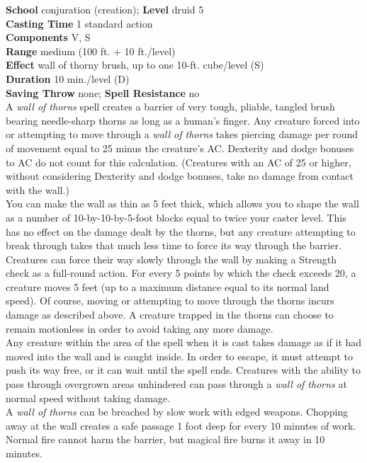 \textbf{School} conjuration (creation); \textbf{Level} druid 5\\
\textbf{Casting Time} 1 standard action\\
\textbf{Components} V, S\\
\textbf{Range }medium (100 ft. + 10 ft./level)\\
\textbf{Effect }wall of thorny brush, up to one 10-ft. cube/level (S)\\
\textbf{Duration} 10 min./level (D)\\
\textbf{Saving Throw} none; \textbf{Spell Resistance} no\\
A \textit{wall of thorns }spell creates a barrier of very tough, pliable, tangled brush bearing needle-sharp thorns as long as a human's finger. Any creature forced into or attempting to move through a \textit{wall of thorns }takes piercing damage per round of movement equal to 25 minus the creature's AC. Dexterity and dodge bonuses to AC do not count for this calculation. (Creatures with an AC of 25 or higher, without considering Dexterity and dodge bonuses, take no damage from contact with the wall.)\\
You can make the wall as thin as 5 feet thick, which allows you to shape the wall as a number of 10-by-10-by-5-foot blocks equal to twice your caster level. This has no effect on the damage dealt by the thorns, but any creature attempting to break through takes that much less time to force its way through the barrier.\\
Creatures can force their way slowly through the wall by making a Strength check as a full-round action. For every 5 points by which the check exceeds 20, a creature moves 5 feet (up to a maximum distance equal to its normal land speed). Of course, moving or attempting to move through the thorns incurs damage as described above. A creature trapped in the thorns can choose to remain motionless in order to avoid taking any more damage.\\
Any creature within the area of the spell when it is cast takes damage as if it had moved into the wall and is caught inside. In order to escape, it must attempt to push its way free, or it can wait until the spell ends. Creatures with the ability to pass through overgrown areas unhindered can pass through a \textit{wall of thorns }at normal speed without taking damage.\\
A \textit{wall of thorns }can be breached by slow work with edged weapons. Chopping away at the wall creates a safe passage 1 foot deep for every 10 minutes of work. Normal fire cannot harm the barrier, but magical fire burns it away in 10 minutes.\\
